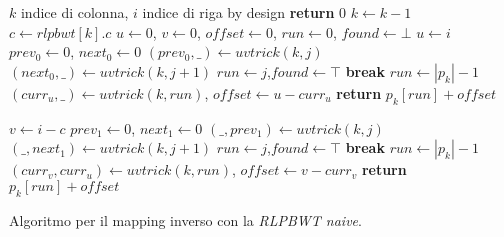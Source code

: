 \begin{algorithm}
  \begin{algorithmic}[1]
    \Comment $k$ indice di colonna, $i$ indice di riga
    \Comment by design
    \State \textbf{return} $0$
    \EndIf
    \State $k\gets k-1$
    \State $c\gets rlpbwt[k].c$
    \State $u\gets 0$, $v\gets 0$, $offset\gets 0$, $run \gets 0$,
    $found\gets \bot$
    \State $u\gets i$
    \State $prev_0\gets 0$, $next_0\gets 0$
    \For {\textit{every} $j\in [0,|p_k|)$}
    \State $(prev_0,\_) \gets uvtrick(k,j)$
    \State $(next_0,\_) \gets uvtrick(k,j+1)$
    \State $run\gets j$,$found\gets \top$
    \State \textbf{break}
    \EndIf
    \EndFor
    \State $run \gets |p_k|-1$
    \EndIf
    \State $(curr_u,\_)\gets uvtrick(k, run)$, $offset\gets u-curr_u$
    \State \textbf{return} $p_k[run]+offset$
    \Else

    \State $v\gets i-c$
    \State $prev_1\gets 0$, $next_1\gets 0$
    \For {\textit{every} $j\in [0,|p_k|)$}
    \State $(\_,prev_1) \gets uvtrick(k,j)$
    \State $(\_,next_1) \gets uvtrick(k,j+1)$
    \State $run\gets j$,$found\gets \top$
    \State \textbf{break}
    \EndIf
    \EndFor
    \State $run \gets |p_k|-1$
    \EndIf
    \State $(curr_v,curr_u)\gets uvtrick(k, run)$, $offset\gets v-curr_v$
    \State \textbf{return} $p_k[run]+offset$
    \EndIf
    \EndFunction
  \end{algorithmic}
  \caption{Algoritmo per il mapping inverso con la \textit{RLPBWT naive}.}
  \label{algo:lfrev}
\end{algorithm}

